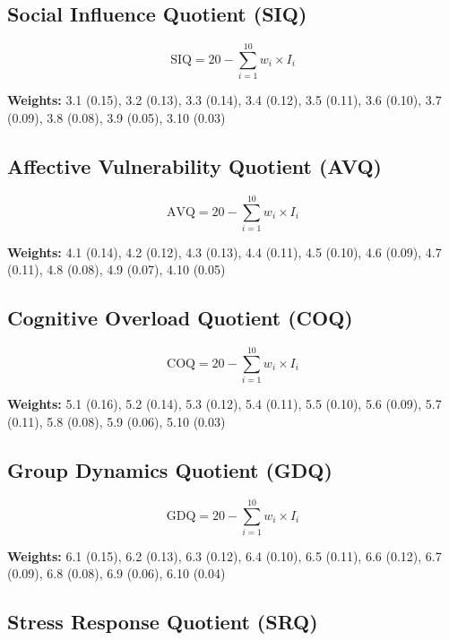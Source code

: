 \documentclass[11pt,a4paper]{article}
\begin{document}
\subsection{Social Influence Quotient (SIQ)}

\begin{equation}
\text{SIQ} = 20 - \sum_{i=1}^{10} w_i \times I_i
\end{equation}

\textbf{Weights:} 3.1 (0.15), 3.2 (0.13), 3.3 (0.14), 3.4 (0.12), 3.5 (0.11), 3.6 (0.10), 3.7 (0.09), 3.8 (0.08), 3.9 (0.05), 3.10 (0.03)

\subsection{Affective Vulnerability Quotient (AVQ)}

\begin{equation}
\text{AVQ} = 20 - \sum_{i=1}^{10} w_i \times I_i
\end{equation}

\textbf{Weights:} 4.1 (0.14), 4.2 (0.12), 4.3 (0.13), 4.4 (0.11), 4.5 (0.10), 4.6 (0.09), 4.7 (0.11), 4.8 (0.08), 4.9 (0.07), 4.10 (0.05)

\subsection{Cognitive Overload Quotient (COQ)}

\begin{equation}
\text{COQ} = 20 - \sum_{i=1}^{10} w_i \times I_i
\end{equation}

\textbf{Weights:} 5.1 (0.16), 5.2 (0.14), 5.3 (0.12), 5.4 (0.11), 5.5 (0.10), 5.6 (0.09), 5.7 (0.11), 5.8 (0.08), 5.9 (0.06), 5.10 (0.03)

\subsection{Group Dynamics Quotient (GDQ)}

\begin{equation}
\text{GDQ} = 20 - \sum_{i=1}^{10} w_i \times I_i
\end{equation}

\textbf{Weights:} 6.1 (0.15), 6.2 (0.13), 6.3 (0.12), 6.4 (0.10), 6.5 (0.11), 6.6 (0.12), 6.7 (0.09), 6.8 (0.08), 6.9 (0.06), 6.10 (0.04)

\subsection{Stress Response Quotient (SRQ)}
\end{document}
